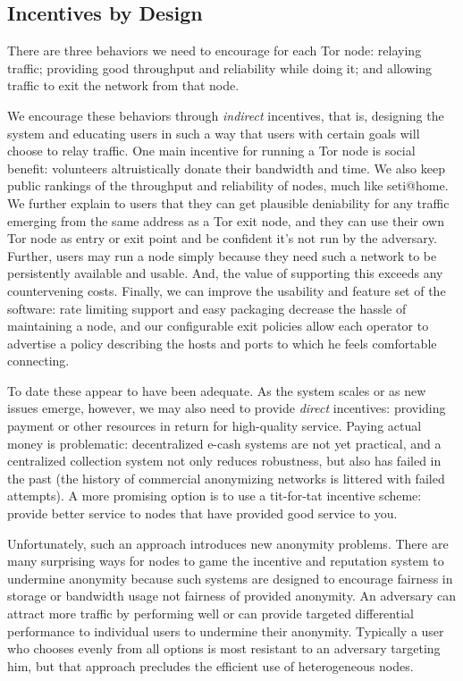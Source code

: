 \documentclass{llncs}
\begin{document}
\subsection{Incentives by Design}

There are three behaviors we need to encourage for each Tor node: relaying
traffic; providing good throughput and reliability while doing it;
and allowing traffic to exit the network from that node.

We encourage these behaviors through \emph{indirect} incentives, that
is, designing the system and educating users in such a way that users
with certain goals will choose to relay traffic.  One
main incentive for running a Tor node is social benefit: volunteers
altruistically donate their bandwidth and time.  We also keep public
rankings of the throughput and reliability of nodes, much like
seti@home.  We further explain to users that they can get plausible
deniability for any traffic emerging from the same address as a Tor
exit node, and they can use their own Tor node
as entry or exit point and be confident it's not run by the adversary.
Further, users may run a node simply because they need such a network 
to be persistently available and usable.
And, the value of supporting this exceeds any countervening costs.
Finally, we can improve the usability and feature set of the software:
rate limiting support and easy packaging decrease the hassle of
maintaining a node, and our configurable exit policies allow each
operator to advertise a policy describing the hosts and ports to which
he feels comfortable connecting.

To date these appear to have been adequate. As the system scales or as
new issues emerge, however, we may also need to provide
 \emph{direct} incentives:
providing payment or other resources in return for high-quality service.
Paying actual money is problematic: decentralized e-cash systems are
not yet practical, and a centralized collection system not only reduces
robustness, but also has failed in the past (the history of commercial
anonymizing networks is littered with failed attempts).  A more promising
option is to use a tit-for-tat incentive scheme: provide better service
to nodes that have provided good service to you.

Unfortunately, such an approach introduces new anonymity problems.
There are many surprising ways for nodes to game the incentive and
reputation system to undermine anonymity because such systems are
designed to encourage fairness in storage or bandwidth usage not
fairness of provided anonymity. An adversary can attract more traffic
by performing well or can provide targeted differential performance to
individual users to undermine their anonymity. Typically a user who
chooses evenly from all options is most resistant to an adversary
targeting him, but that approach precludes the efficient use
of heterogeneous nodes.
\end{document}
